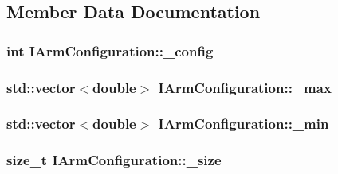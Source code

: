 \subsection{Member Data Documentation}
\hypertarget{classIArmConfiguration_a0075e845267a9821acd152ce4866e66c}{
\subsubsection[{\-\_\-config}]{\setlength{\rightskip}{0pt plus 5cm}int I\-Arm\-Configuration\-::\-\_\-config\hspace{0.3cm}{\ttfamily [protected]}}}\label{classIArmConfiguration_a0075e845267a9821acd152ce4866e66c}
\hypertarget{classIArmConfiguration_a3103e1f2fff69e56a46e3277e02649a9}{
\subsubsection[{\-\_\-max}]{\setlength{\rightskip}{0pt plus 5cm}std\-::vector$<$double$>$ I\-Arm\-Configuration\-::\-\_\-max\hspace{0.3cm}{\ttfamily [protected]}}}\label{classIArmConfiguration_a3103e1f2fff69e56a46e3277e02649a9}
\hypertarget{classIArmConfiguration_ae918d115cd3bb8702dee12799666c630}{
\subsubsection[{\-\_\-min}]{\setlength{\rightskip}{0pt plus 5cm}std\-::vector$<$double$>$ I\-Arm\-Configuration\-::\-\_\-min\hspace{0.3cm}{\ttfamily [protected]}}}\label{classIArmConfiguration_ae918d115cd3bb8702dee12799666c630}
\hypertarget{classIArmConfiguration_a58e9669a13e5409691f4cc5511bd26b1}{
\subsubsection[{\-\_\-size}]{\setlength{\rightskip}{0pt plus 5cm}size\-\_\-t I\-Arm\-Configuration\-::\-\_\-size\hspace{0.3cm}{\ttfamily [protected]}}}\label{classIArmConfiguration_a58e9669a13e5409691f4cc5511bd26b1}
